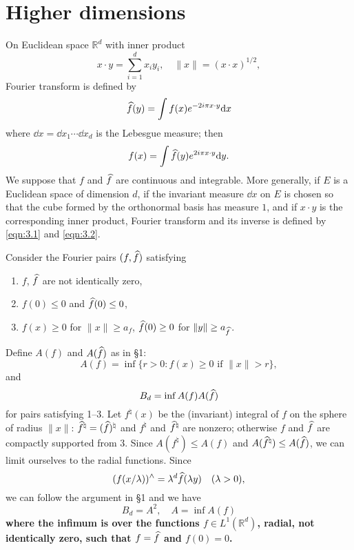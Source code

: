 \section{Higher dimensions}

On Euclidean space $\mathbb{R}^{d}$ with inner product
\[
    x \cdot y = \sum_{i=1}^{d} x_i y_i, \quad \|x\| = (x \cdot x)^{1/2},
\]
Fourier transform is defined by
\begin{equation}
    \label{eqn:3.1}
    \widehat{f}(y) = \int f(x) e^{-2 i \pi x \cdot y} \mathrm{d} x
\end{equation}
where $\dd x = \dd x_1 \cdots \dd x_d$ is the Lebesgue measure; then
\begin{equation}
    \label{eqn:3.2}
    f(x) = \int \widehat{f}(y) e^{2 i \pi x \cdot y} \mathrm{d} y.
\end{equation}
We suppose that $f$ and $\widehat{f}$ are continuous and integrable.
More generally, if $E$ is a Euclidean space of dimension $d$, if the invariant measure $\dd x$ on $E$ is chosen so that the cube formed by the orthonormal basis has measure $1$, and if $x\cdot y$ is the corresponding inner product, Fourier transform and its inverse is defined by \eqref{eqn:3.1} and \eqref{eqn:3.2}.

Consider the Fourier pairs $(f, \widehat{f})$ satisfying
\begin{enumerate}
    \item $f$, $\widehat{f}$ are not identically zero,
    \item $f(0) \leq 0$ and $\widehat{f}(0) \leq 0$,
    \item $f(x) \geq 0$ for $\|x\| \geq a_f$, $\widehat{f}(0) \geq 0$ for $\|y\| \geq a_{\widehat{f}}$.
\end{enumerate}
Define $A(f)$ and $A(\widehat{f})$ as in \S 1:
\[
    A(f) = \inf\{r >0: f(x) \geq 0 \text{ if } \|x\| > r\},
\]
and
\[
    B_d = \inf A(f) A(\widehat{f})
\]
for pairs satisfying 1--3.
Let $f^\natural(x)$ be the (invariant) integral of $f$ on the sphere of radius $\|x\|$: $\widehat{f}^\natural = (\widehat{f})^{\natural}$ and $f^\natural$ and $\widehat{f}^{\natural}$ are nonzero; otherwise $f$ and $\widehat{f}$ are compactly supported from 3.
Since $A(f^\natural) \leq A(f)$ and $A(\widehat{f}^{\natural}) \leq A(\widehat{f})$, we can limit ourselves to the radial functions.
Since
\[
    (f(x/\lambda))^\wedge = \lambda^d \widehat{f}(\lambda y)\quad (\lambda > 0),
\]
we can follow the argument in \S 1 and we have
\begin{equation}
    \label{eqn:3.4}
    B_d = A^2, \quad A = \inf A(f)
\end{equation}
\textbf{where the infimum is over the functions $f \in L^1(\mathbb{R}^d)$, radial, not identically zero, such that $f = \widehat{f}$ and $f(0) = 0$.}

